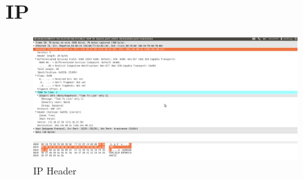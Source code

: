 \documentclass[a4,11pt]{article}
\begin{document}
\section{IP}
 \begin{figure}[h!]
      \includegraphics[width=0.9\textwidth]{IP-Header.png}
          \caption{IP Header}
          \label{IP-Header}
  \end{figure}
\end{document}
